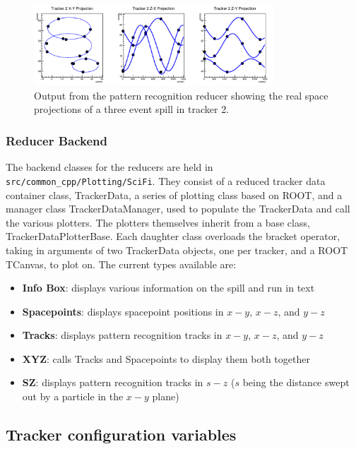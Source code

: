 \begin{figure}[htb]
  \begin{center}
    \includegraphics[width=0.8\textwidth]{detectors/tracker/06-CodeDesign/Figures/xyzPlotterOutput.pdf}
  \end{center}
  \caption{Output from the pattern recognition reducer showing the real space projections of a three event spill in tracker 2.}
  \label{Fig:SciFiReducerXYZ}
\end{figure}

\subsubsection{Reducer Backend}

The backend classes for the reducers are held in \verb;src/common_cpp/Plotting/SciFi;.  They consist of a reduced tracker data container class, TrackerData, a series of plotting class based on ROOT, and a manager class TrackerDataManager, used to populate the TrackerData and call the various plotters. The plotters themselves inherit from a base class, TrackerDataPlotterBase.  Each daughter class overloads the bracket operator, taking in arguments of two TrackerData objects, one per tracker, and a ROOT TCanvas, to plot on.  The current types available are:

\begin{itemize}
 \item \textbf{Info Box}: displays various information on the spill and run in text
 \item \textbf{Spacepoints}: displays spacepoint positions in $x-y$, $x-z$, and $y-z$
 \item \textbf{Tracks}: displays pattern recognition tracks in $x-y$, $x-z$, and $y-z$ 
 \item \textbf{XYZ}: calls Tracks and Spacepoints to display them both together
  \item \textbf{SZ}: displays pattern recognition tracks in $s-z$ ($s$ being the distance swept out by a particle in the $x-y$ plane)
\end{itemize}

\subsection{Tracker configuration variables}

